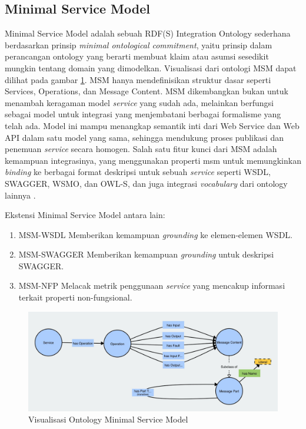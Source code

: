 \subsection{Minimal Service Model}
\label{subsec:minimal-service-model}

Minimal Service Model adalah sebuah RDF(S) Integration Ontology sederhana berdasarkan prinsip \textit{minimal ontological commitment}, yaitu prinsip dalam perancangan ontology yang berarti membuat klaim atau asumsi sesedikit mungkin tentang domain yang dimodelkan. Visualisasi dari ontologi MSM dapat dilihat pada gambar \ref{image:msm-visualization}. MSM hanya mendefinisikan struktur dasar seperti Services, Operations, dan Message Content. MSM dikembangkan bukan untuk menambah keragaman model \textit{service} yang sudah ada, melainkan berfungsi sebagai model untuk integrasi yang menjembatani berbagai formalisme yang telah ada. Model ini mampu menangkap semantik inti dari Web Service dan Web API dalam satu model yang sama, sehingga mendukung proses publikasi dan penemuan \textit{service} secara homogen. Salah satu fitur kunci dari MSM adalah kemampuan integrasinya, yang menggunakan properti msm untuk memungkinkan \textit{binding} ke berbagai format deskripsi untuk sebuah \textit{service} seperti WSDL, SWAGGER, WSMO, dan OWL-S, dan juga integrasi \textit{vocabulary} dari ontology lainnya \parencite{iserve2015datamodel}.

Ekstensi Minimal Service Model antara lain:
\begin{enumerate}
	\item MSM-WSDL \break Memberikan kemampuan \textit{grounding} ke elemen-elemen WSDL.
	\item MSM-SWAGGER \break Memberikan kemampuan \textit{grounding} untuk deskripsi SWAGGER.
	\item MSM-NFP \break Melacak metrik penggunaan \textit{service} yang mencakup informasi terkait properti non-fungsional.
\end{enumerate}

\begin{figure}[ht]
	\centering
	\includegraphics[width=1\textwidth]{resources/chapter-2/msm-visualization.jpg}
	\caption{Visualisasi Ontology Minimal Service Model \parencite{third2017linked}}
	\label{image:msm-visualization}
\end{figure}